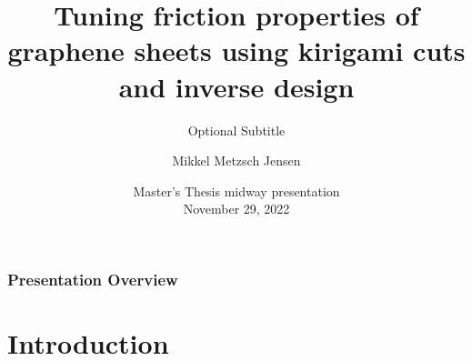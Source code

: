 \documentclass[
	10pt, %
]{beamer}
\title[Short Title]{Tuning friction properties of graphene sheets using kirigami cuts and inverse design} %
\subtitle{Optional Subtitle} %
\author[Mikkel Metzsch Jensen]{Mikkel Metzsch Jensen} %
\institute[UiO]{Universitetet i Oslo} %
\date[\today]{Master's Thesis midway presentation \\ November 29, 2022} %
\begin{document}

\begin{frame}
	\titlepage %
\end{frame}



\begin{frame}
	\frametitle{Presentation Overview} %
	
	\tableofcontents %
\end{frame}



\section{Introduction}
\end{document}
